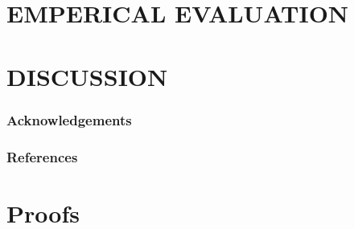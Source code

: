 \documentclass[twoside]{article}
\begin{document}
\section{EMPERICAL EVALUATION}
\section{DISCUSSION}

\subsubsection*{Acknowledgements}

\subsubsection*{References}
\printbibliography


\clearpage
\appendix
\section{Proofs}
\end{document}
